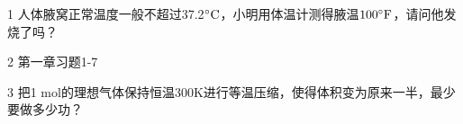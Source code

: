 \documentclass[CJK]{beamer}
\begin{document}
\begin{frame}
\bch
\bitem
\item[1]{人体腋窝正常温度一般不超过37.2$^\circ \mathrm{C}$，小明用体温计测得腋温$100{^\circ \mathrm{F}}$，请问他发烧了吗？}
\item[2]{第一章习题1-7}
\item[3]{把1 mol的理想气体保持恒温300K进行等温压缩，使得体积变为原来一半，最少要做多少功？}
\eitem
 
\ech
\end{frame}
\end{document}
